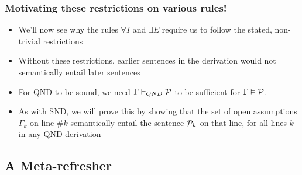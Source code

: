 \begin{frame}
\frametitle{Motivating these restrictions on various rules!}

\begin{itemize}[<+->]

\item We'll now see why the rules $\forall I$ and $\exists E$ require us to follow the stated, non-trivial restrictions

\item Without these restrictions, earlier sentences in the derivation would not semantically entail later sentences

\item For QND to be sound, we need $\Gamma \vdash_{QND} \mathcal{P}$ to be sufficient for $\Gamma \vDash \mathcal{P}$. 

\item As with SND, we will prove this by showing that the set of open assumptions $\Gamma_k$ on line \#$k$ semantically entail the sentence $\mathcal{P}_k$ on that line, for all lines $k$ in any QND derivation 



\end{itemize}
\end{frame}

\iffalse %
\subsection{A Meta-refresher}

